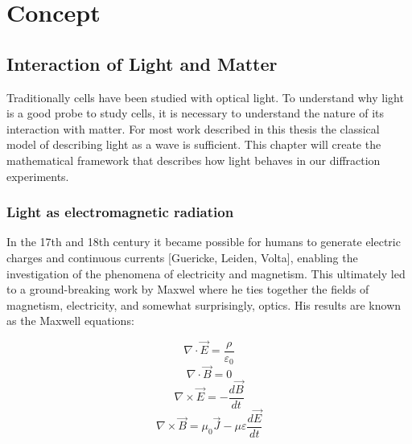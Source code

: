 \part{Concept}%

\chapter{Interaction of Light and Matter}
Traditionally cells have been studied with optical light. To understand why light is a good probe to study cells, it is necessary to understand the nature of its interaction with matter. For most work described in this thesis the classical model of describing light as a wave is sufficient. This chapter will create the mathematical framework that describes how light behaves in our diffraction experiments. 

\section{Light as electromagnetic radiation}
In the 17th and 18th century it became possible for humans to generate electric charges and continuous currents [Guericke, Leiden, Volta], enabling the investigation of the phenomena of electricity and magnetism. This ultimately led to a ground-breaking work by Maxwel where he ties together the fields of magnetism, electricity, and somewhat surprisingly, optics. His results are known as the Maxwell equations:

\begin{equation} \nabla \cdot   \vec{E} = \frac{\rho}{\varepsilon_0 }\label{eq:maxlaw1}\end{equation}
\begin{equation} \nabla \cdot   \vec{B} = 0 \label{eq:maxlaw2}\end{equation}
\begin{equation} \nabla \times \vec{E} = -\frac{d\vec{B}}{dt}\label{eq:maxlaw3}\end{equation}
\begin{equation} \nabla \times \vec{B} = \mu_0 \vec{J} -\mu\varepsilon\frac{d\vec{E}}{dt}\label{eq:maxlaw4}\end{equation}

